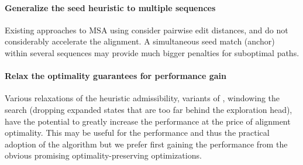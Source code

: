 \paragraph{Generalize the seed heuristic to multiple sequences}
Existing approaches to MSA using \A consider pairwise edit distances, and do not
considerably accelerate the alignment. A simultaneous seed match (anchor) within
several sequences may provide much bigger penalties for suboptimal paths.

\paragraph{Relax the \A optimality guarantees for performance gain}
Various relaxations of the heuristic admissibility, variants of \A, windowing
the search (dropping expanded states that are too far behind the exploration
head), have the potential to greatly increase the performance at the price of
alignment optimality. This may be useful for the performance and thus the
practical adoption of the algorithm but we prefer first gaining the performance
from the obvious promising optimality-preserving optimizations.

%

